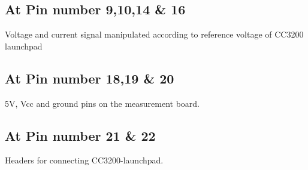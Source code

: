 \documentclass[a4paper,12pt,oneside]{book}
\begin{document}
\subsection*{At Pin number 9,10,14 \& 16}
Voltage and current signal manipulated according to reference voltage of CC3200 launchpad \\

\subsection*{At Pin number 18,19 \& 20}
5V, Vcc and ground pins on the measurement board.  \\
\subsection*{At Pin number 21 \& 22}
Headers for connecting CC3200-launchpad. \\
\end{document}
